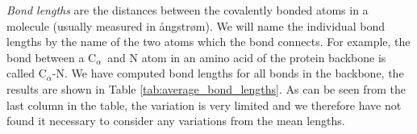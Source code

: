 \documentclass[a0,portrait]{a0poster}
\newcommand{\Ca}{C$_{\alpha}${}}
\begin{document}
\begin{GridBlock}{0}{75}{48}
\textit{Bond lengths} are the distances between the covalently bonded atoms
in a molecule (usually measured in ångstrøm). We will name the
individual bond lengths by the name of the two atoms which the bond
connects. For example, the bond between a \Ca\ and N atom in an amino acid of
the protein backbone is called \Ca -N. We have computed bond lengths
for all bonds in the backbone, the results are shown in Table
\ref{tab:average_bond_lengths}. As can be seen from the last column in
the table, the variation is very limited and we therefore have not
found it necessary to consider any variations from the mean
lengths.
\end{GridBlock}

\begin{GridBlock}{51}{75}{48}
\begin{multicols}{2}
\end{multicols}
\end{GridBlock}
\end{document}
